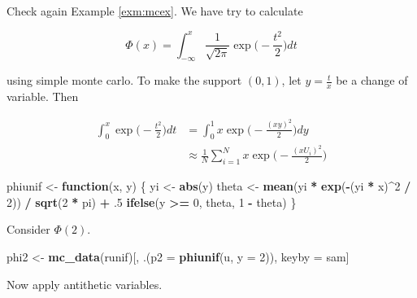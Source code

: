 \documentclass[]{book}
\newenvironment{Shaded}{\begin{snugshade}}{\end{snugshade}}
\newcommand{\ControlFlowTok}[1]{\textcolor[rgb]{0.13,0.29,0.53}{\textbf{#1}}}
\newcommand{\DataTypeTok}[1]{\textcolor[rgb]{0.13,0.29,0.53}{#1}}
\newcommand{\DecValTok}[1]{\textcolor[rgb]{0.00,0.00,0.81}{#1}}
\newcommand{\FloatTok}[1]{\textcolor[rgb]{0.00,0.00,0.81}{#1}}
\newcommand{\KeywordTok}[1]{\textcolor[rgb]{0.13,0.29,0.53}{\textbf{#1}}}
\newcommand{\NormalTok}[1]{#1}
\newcommand{\OperatorTok}[1]{\textcolor[rgb]{0.81,0.36,0.00}{\textbf{#1}}}
\newcommand{\StringTok}[1]{\textcolor[rgb]{0.31,0.60,0.02}{#1}}
\theoremstyle{definition}
\theoremstyle{definition}
\theoremstyle{definition}
\theoremstyle{remark}
\begin{document}
Check again Example \ref{exm:mcex}. We have try to calculate

\[\Phi(x) = \int_{-\infty}^x \frac{1}{\sqrt{2\pi}}\exp\bigg(-\frac{t^2}{2}\bigg)dt\]

using simple monte carlo. To make the support \((0, 1)\), let \(y = \frac{t}{x}\) be a change of variable. Then

\begin{equation*}
  \begin{split}
    \int_0^x \exp\bigg(-\frac{t^2}{2}\bigg) dt & = \int_0^1 x\exp\bigg(-\frac{(xy)^2}{2}\bigg) dy \\
    & \approx \frac{1}{N} \sum_{i = 1}^N x\exp\bigg(-\frac{(xU_i)^2}{2}\bigg)
  \end{split}
\end{equation*}

\begin{Shaded}
\begin{Highlighting}[]
\NormalTok{phiunif <-}\StringTok{ }\ControlFlowTok{function}\NormalTok{(x, y) \{}
\NormalTok{  yi <-}\StringTok{ }\KeywordTok{abs}\NormalTok{(y)}
\NormalTok{  theta <-}\StringTok{ }\KeywordTok{mean}\NormalTok{(yi }\OperatorTok{*}\StringTok{ }\KeywordTok{exp}\NormalTok{(}\OperatorTok{-}\NormalTok{(yi }\OperatorTok{*}\StringTok{ }\NormalTok{x)}\OperatorTok{^}\DecValTok{2} \OperatorTok{/}\StringTok{ }\DecValTok{2}\NormalTok{)) }\OperatorTok{/}\StringTok{ }\KeywordTok{sqrt}\NormalTok{(}\DecValTok{2} \OperatorTok{*}\StringTok{ }\NormalTok{pi) }\OperatorTok{+}\StringTok{ }\FloatTok{.5}
  \KeywordTok{ifelse}\NormalTok{(y }\OperatorTok{>=}\StringTok{ }\DecValTok{0}\NormalTok{, theta, }\DecValTok{1} \OperatorTok{-}\StringTok{ }\NormalTok{theta)}
\NormalTok{\}}
\end{Highlighting}
\end{Shaded}

Consider \(\Phi(2)\).

\begin{Shaded}
\begin{Highlighting}[]
\NormalTok{phi2 <-}
\StringTok{  }\KeywordTok{mc_data}\NormalTok{(runif)[,}
\NormalTok{                 .(}\DataTypeTok{p2 =} \KeywordTok{phiunif}\NormalTok{(u, }\DataTypeTok{y =} \DecValTok{2}\NormalTok{)),}
\NormalTok{                 keyby =}\StringTok{ }\NormalTok{sam]}
\end{Highlighting}
\end{Shaded}

Now apply antithetic variables.
\end{document}
